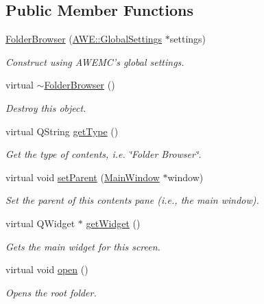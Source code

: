 \subsection*{Public Member Functions}
\begin{DoxyCompactItemize}
\item 
\hyperlink{class_u_i_1_1_folder_browser_a89e204a5e9254a2f07616531eda762f0}{Folder\-Browser} (\hyperlink{class_a_w_e_1_1_global_settings}{A\-W\-E\-::\-Global\-Settings} $\ast$settings)
\begin{DoxyCompactList}\small\item\em Construct using A\-W\-E\-M\-C's global settings. \end{DoxyCompactList}\item 
\hypertarget{class_u_i_1_1_folder_browser_a389c509af1dd5ee9b31caed45ce8dce4}{virtual \hyperlink{class_u_i_1_1_folder_browser_a389c509af1dd5ee9b31caed45ce8dce4}{$\sim$\-Folder\-Browser} ()}\label{class_u_i_1_1_folder_browser_a389c509af1dd5ee9b31caed45ce8dce4}

\begin{DoxyCompactList}\small\item\em Destroy this object. \end{DoxyCompactList}\item 
virtual Q\-String \hyperlink{class_u_i_1_1_folder_browser_a9c38475f8a07cf1e05bbbc81f0c24ec0}{get\-Type} ()
\begin{DoxyCompactList}\small\item\em Get the type of contents, i.\-e. {\ttfamily \char`\"{}\-Folder Browser\char`\"{}}. \end{DoxyCompactList}\item 
virtual void \hyperlink{class_u_i_1_1_folder_browser_ab72ccd010e607bc690ebbe34af4fa489}{set\-Parent} (\hyperlink{class_u_i_1_1_main_window}{Main\-Window} $\ast$window)
\begin{DoxyCompactList}\small\item\em Set the parent of this contents pane (i.\-e., the main window). \end{DoxyCompactList}\item 
virtual Q\-Widget $\ast$ \hyperlink{class_u_i_1_1_folder_browser_aad7914c03ed7bca3e4b26a62e9a438cf}{get\-Widget} ()
\begin{DoxyCompactList}\small\item\em Gets the main widget for this screen. \end{DoxyCompactList}\item 
\hypertarget{class_u_i_1_1_folder_browser_a9392ae267a0807d1c7c53aa0b67dbfb1}{virtual void \hyperlink{class_u_i_1_1_folder_browser_a9392ae267a0807d1c7c53aa0b67dbfb1}{open} ()}\label{class_u_i_1_1_folder_browser_a9392ae267a0807d1c7c53aa0b67dbfb1}

\begin{DoxyCompactList}\small\item\em Opens the root folder. \end{DoxyCompactList}\end{DoxyCompactItemize}
